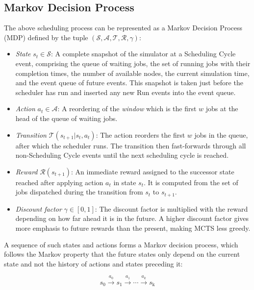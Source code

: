 \documentclass[conference]{IEEEtran}
\begin{document}
\subsection{Markov Decision Process}
\label{sec:mdp}
The above scheduling process can be represented as a Markov Decision Process (MDP) defined by the tuple $(\mathcal{S}, \mathcal{A}, \mathcal{T}, \mathcal{R}, \gamma)$:

\begin{itemize}
    \item \textit{State} $s_t \in \mathcal{S}$: A complete snapshot of the simulator at a Scheduling Cycle event, comprising the queue of waiting jobs, the set of running jobs with their completion times, the number of available nodes, the current simulation time, and the event queue of future events. This snapshot is taken just before the scheduler has run and inserted any new Run events into the event queue.

    \item \textit{Action} $a_t \in \mathcal{A}$: A reordering of the \emph{window} which is the first $w$ jobs at the head of the queue of waiting jobs.

    \item \textit{Transition} $\mathcal{T}(s_{t+1} | s_t, a_t)$: The action reorders the first $w$ jobs in the queue, after which the scheduler runs. The transition then fast-forwards through all non-Scheduling Cycle events until the next scheduling cycle is reached.

    \item \textit{Reward} $\mathcal{R}(s_{t+1})$: An immediate reward assigned to the successor state reached after applying action $a_t$ in state $s_t$. It is computed from the set of jobs dispatched during the transition from $s_t$ to $s_{t+1}$.

    \item \textit{Discount factor} $\gamma \in [0, 1]$: The discount factor is multiplied with the reward depending on how far ahead it is in the future. A higher discount factor gives more emphasis to future rewards than the present, making MCTS less greedy.
\end{itemize}

A sequence of such states and actions forms a Markov decision process, which follows the Markov property that the future states only depend on the current state and not the history of actions and states preceding it:

\begin{equation}
    s_{\text{0}} \xrightarrow{a_0} s_1 \xrightarrow{a_1} \cdots \xrightarrow{a_k} s_{\text{k}}
\end{equation}
\end{document}
